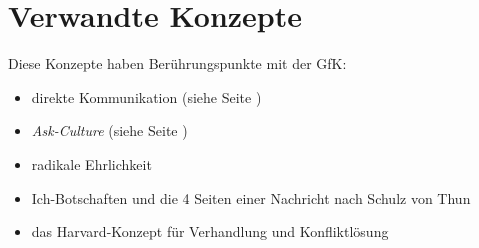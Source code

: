 \section{Verwandte Konzepte}
\label{verwandte-konzepte}

Diese Konzepte haben Berührungspunkte mit der GfK:

\begin{itemize}
  \item direkte Kommunikation (siehe Seite \pageref{direkte-kommunikation})
  \item \emph{Ask-Culture} (siehe Seite \pageref{ask-guess-culture})
  \item radikale Ehrlichkeit \cite{radical-candor, radical-honesty}
  \item Ich-Botschaften und die 4 Seiten einer Nachricht nach Schulz von Thun \cite{miteinander-reden-1}
  \item das Harvard-Konzept \cite{harvard-konzept} für Verhandlung und Konfliktlösung
\end{itemize}

